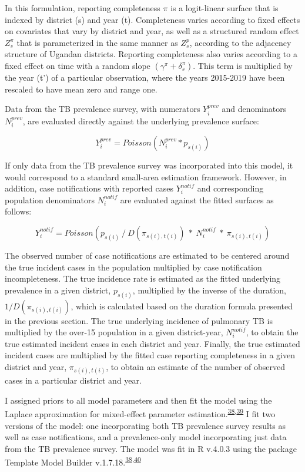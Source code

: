 \documentclass[
]{article}
\begin{document}
In this formulation, reporting completeness \(\pi\) is a logit-linear surface that is indexed by district (s) and year (t). Completeness varies according to fixed effects on covariates that vary by district and year, as well as a structured random effect \(Z^\pi_s\) that is parameterized in the same manner as \(Z^p_s\), according to the adjacency structure of Ugandan districts. Reporting completeness also varies according to a fixed effect on time with a random slope \((\gamma^\pi + \delta^\pi_s)\). This term is multiplied by the year (t') of a particular observation, where the years 2015-2019 have been rescaled to have mean zero and range one.

Data from the TB prevalence survey, with numerators \(Y^{prev}_i\) and denominators \(N^{prev}_i\), are evaluated directly against the underlying prevalence surface:

\[Y^{prev}_i = Poisson(N^{prev}_i * p_{s(i)})\]

If only data from the TB prevalence survey was incorporated into this model, it would correspond to a standard small-area estimation framework. However, in addition, case notifications with reported cases \(Y^{notif}_i\) and corresponding population denominators \(N^{notif}_i\) are evaluated against the fitted surfaces as follows:

\[Y^{notif}_i = Poisson(p_{s(i)} ~/~ D(\pi_{s(i),t(i)}) ~*~ N^{notif}_i ~*~ \pi_{s(i),t(i)})\]

The observed number of case notifications are estimated to be centered around the true incident cases in the population multiplied by case notification incompleteness. The true incidence rate is estimated as the fitted underlying prevalence in a given district, \(p_{s(i)}\), multiplied by the inverse of the duration, \(1/D(\pi_{s(i),t(i)})\), which is calculated based on the duration formula presented in the previous section. The true underlying incidence of pulmonary TB is multiplied by the over-15 population in a given district-year, \(N^{notif}_i\), to obtain the true estimated incident cases in each district and year. Finally, the true estimated incident cases are multiplied by the fitted case reporting completeness in a given district and year, \(\pi_{s(i),t(i)}\), to obtain an estimate of the number of observed cases in a particular district and year.

I assigned priors to all model parameters and then fit the model using the Laplace approximation for mixed-effect parameter estimation.\textsuperscript{\protect\hyperlink{ref-Kristensen2016}{38},\protect\hyperlink{ref-Thorson2016}{39}} I fit two versions of the model: one incorporating both TB prevalence survey results as well as case notifications, and a prevalence-only model incorporating just data from the TB prevalence survey. The model was fit in R v.4.0.3 using the package Template Model Builder v.1.7.18.\textsuperscript{\protect\hyperlink{ref-Kristensen2016}{38},\protect\hyperlink{ref-RCoreTeam2018}{40}}
\end{document}
